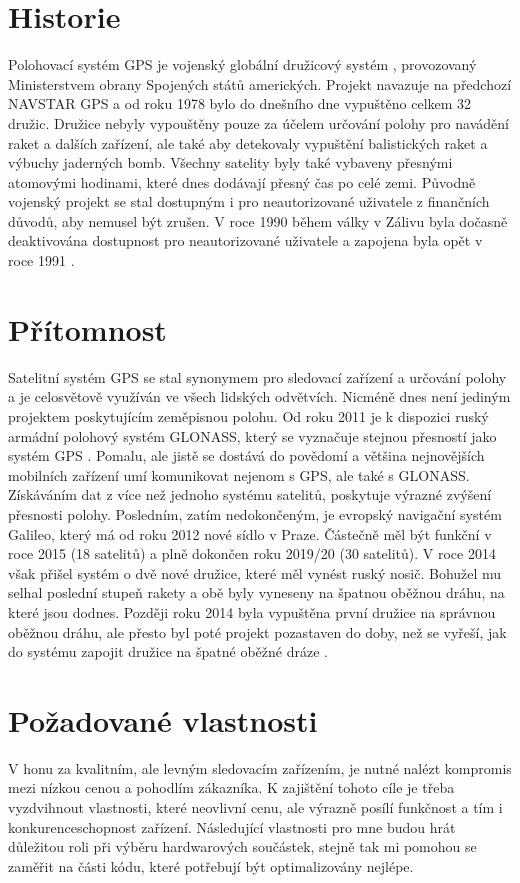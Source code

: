\documentclass[FM,BP]{tulthesis}  %
\begin{document}
\section{Historie}
Polohovací systém GPS je vojenský globální družicový systém \cite{what}, provozovaný Ministerstvem obrany Spojených států amerických. Projekt navazuje na předchozí NAVSTAR GPS a od roku 1978 bylo do dnešního dne vypuštěno celkem 32 družic. Družice nebyly vypouštěny pouze za účelem určování polohy pro navádění raket a dalších zařízení, ale také aby detekovaly vypuštění balistických raket a výbuchy jaderných bomb. Všechny satelity byly také vybaveny přesnými atomovými hodinami, které dnes dodávají přesný čas po celé zemi. Původně vojenský projekt se stal dostupným i pro neautorizované uživatele z finančních důvodů, aby nemusel být zrušen. V roce 1990 během války v Zálivu byla dočasně deaktivována dostupnost pro neautorizované uživatele a zapojena byla opět v roce 1991  \cite{guide}.

\section{Přítomnost}
Satelitní systém GPS se stal synonymem pro sledovací zařízení a určování polohy a je celosvětově využíván ve všech lidských odvětvích. Nicméně dnes není jediným projektem poskytujícím zeměpisnou polohu. Od roku 2011 je k dispozici ruský armádní polohový systém GLONASS, který se vyznačuje stejnou přesností jako systém GPS \cite{glonass}. Pomalu, ale jistě se dostává do povědomí a většina nejnovějších mobilních zařízení umí komunikovat nejenom s GPS, ale také s GLONASS. Získáváním dat z více než jednoho systému satelitů, poskytuje výrazné zvýšení přesnosti polohy. Posledním, zatím nedokončeným, je evropský navigační systém Galileo, který má od roku 2012 nové sídlo v Praze. Částečně měl být funkční v roce 2015 (18 satelitů) a plně dokončen roku 2019/20 (30 satelitů). V roce 2014 však přišel systém o dvě nové družice, které měl vynést ruský nosič. Bohužel mu selhal poslední stupeň rakety a obě byly vyneseny na špatnou oběžnou dráhu, na které jsou dodnes. Později roku 2014 byla vypuštěna první družice na správnou oběžnou dráhu, ale přesto byl poté projekt pozastaven do doby, než se vyřeší, jak do systému zapojit družice na špatné oběžné dráze \cite{gps}.


\section{Požadované vlastnosti}
V honu za kvalitním, ale levným sledovacím zařízením, je nutné nalézt kompromis mezi nízkou cenou a pohodlím zákazníka. K zajištění tohoto cíle je třeba vyzdvihnout vlastnosti, které neovlivní cenu, ale výrazně posílí funkčnost a tím i konkurenceschopnost zařízení. Následující vlastnosti pro mne budou hrát důležitou roli při výběru hardwarových součástek, stejně tak mi pomohou se zaměřit na části kódu, které potřebují být optimalizovány nejlépe.
\end{document}
